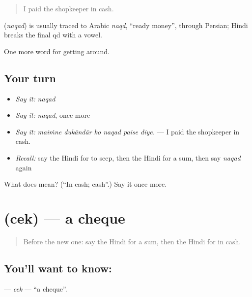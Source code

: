 \begin{quote}
I paid the shopkeeper in cash.
\end{quote}

\begin{cousinweb}
\textbf{} (\emph{naqad}) is usually traced to Arabic \emph{naqd}, \textquotedblleft{}ready money\textquotedblright{}, through Persian; Hindi breaks the final qd with a vowel.
\end{cousinweb}

\begin{grammarlens}[title={What you've built}]
One more word for getting around.
\end{grammarlens}

\subsection*{Your turn}
\begin{itemize}
\raggedright
  \item \emph{Say it:} \emph{naqad}
  \item \emph{Say it:} \emph{naqad}, once more
  \item \emph{Say it:} \emph{maiṁne dukāndār ko naqad paise diye.} — I paid the shopkeeper in cash.
  \item \emph{Recall:} say the Hindi for to seep, then the Hindi for a sum, then say \emph{naqad} again
\end{itemize}

\begin{tcolorbox}[breakable,colback=teal!4,colframe=teal!35!black,title={Before you move on}]
What does  mean? (\textquotedblleft{}In cash; cash\textquotedblright{}.) Say it once more.
\end{tcolorbox}
\section[\texorpdfstring{\hi{चेक} (cek)}{चेक (cek)}]{ (cek) — a cheque}

\label{lesson:HI-C426-cek}



\begin{quote}
Before the new one: say the Hindi for a sum, then the Hindi for in cash.
\end{quote}

\subsection*{You'll want to know: }
\textbf{} — \emph{cek} — \textquotedblleft{}a cheque\textquotedblright{}.

